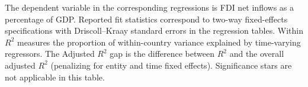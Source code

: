 \begin{table}[htbp]
\centering
\caption{Compact diagnostics for the reported models}
\label{tab:compact-diagnostics}
\begin{threeparttable}
\scriptsize
{}
\begin{tablenotes}[flushleft]
\footnotesize
\item The dependent variable in the corresponding regressions is FDI net inflows as a percentage of GDP. Reported fit statistics correspond to two-way fixed-effects specifications with Driscoll--Kraay standard errors in the regression tables. Within $R^2$ measures the proportion of within-country variance explained by time-varying regressors. The Adjusted $R^2$ gap is the difference between $R^2$ and the overall adjusted $R^2$ (penalizing for entity and time fixed effects). Significance stars are not applicable in this table.
\end{tablenotes}
\end{threeparttable}
\end{table}